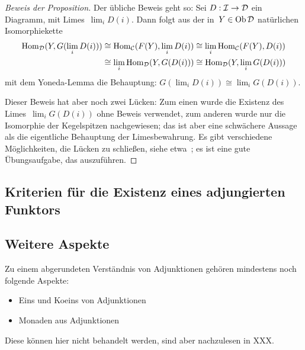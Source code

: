 \begin{proof}[Beweis der Proposition]
Der übliche Beweis geht so: Sei $D:\mathcal{I}\to\mathcal{D}$ ein Diagramm, mit Limes~$\lim_i D(i)$.
Dann folgt aus der in~$Y \in \operatorname{Ob}\mathcal{D}$ natürlichen Isomorphiekette
\begin{align*}
  \mathrm{Hom}_{\mathcal{D}}(Y,G(\lim_i D(i))) &\cong
  \mathrm{Hom}_{\mathcal{C}}(F(Y),\lim_i D(i)) \cong
  \lim_i \mathrm{Hom}_{\mathcal{C}}(F(Y), D(i)) \\
  & \cong
  \lim_i \mathrm{Hom}_{\mathcal{D}}(Y, G(D(i))) \cong
  \mathrm{Hom}_{\mathcal{D}}(Y, \lim_i G(D(i)))
\end{align*}
mit dem Yoneda-Lemma die Behauptung: $G(\lim_i D(i)) \cong \lim_i G(D(i))$.

Dieser Beweis hat aber noch zwei Lücken: Zum einen wurde die Existenz des
Limes~$\lim_i G(D(i))$ ohne Beweis verwendet, zum anderen wurde nur die
Isomorphie der Kegelspitzen nachgewiesen; das ist aber eine schwächere Aussage
als die eigentliche Behauptung der Limesbewahrung. Es gibt verschiedene
Möglichkeiten, die Lücken zu schließen, siehe etwa~\cite{gaillard,lin}; es ist
eine gute Übungsaufgabe, das auszuführen.
\end{proof}


\subsection{Kriterien für die Existenz eines adjungierten Funktors}


\subsection{Weitere Aspekte}

Zu einem abgerundeten Verständnis von Adjunktionen gehören mindestens noch folgende
Aspekte:
\begin{itemize}
\item Eins und Koeins von Adjunktionen
\item Monaden aus Adjunktionen
\end{itemize}
Diese können hier nicht behandelt werden, sind aber nachzulesen in XXX.


